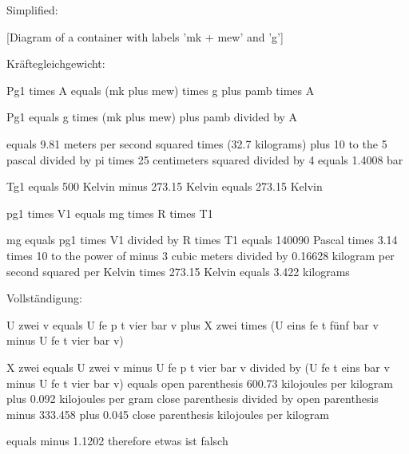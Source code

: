 Simplified:

[Diagram of a container with labels 'mk + mew' and 'g']

Kräftegleichgewicht:

Pg1 times A equals (mk plus mew) times g plus pamb times A

Pg1 equals g times (mk plus mew) plus pamb divided by A

equals 9.81 meters per second squared times (32.7 kilograms) plus 10 to the 5 pascal divided by pi times 25 centimeters squared divided by 4 equals 1.4008 bar

Tg1 equals 500 Kelvin minus 273.15 Kelvin equals 273.15 Kelvin

pg1 times V1 equals mg times R times T1

mg equals pg1 times V1 divided by R times T1 equals 140090 Pascal times 3.14 times 10 to the power of minus 3 cubic meters divided by 0.16628 kilogram per second squared per Kelvin times 273.15 Kelvin equals 3.422 kilograms

Vollständigung:

U zwei v equals U fe p t vier bar v plus X zwei times (U eins fe t fünf bar v minus U fe t vier bar v)

X zwei equals U zwei v minus U fe p t vier bar v divided by (U fe t eins bar v minus U fe t vier bar v) equals open parenthesis 600.73 kilojoules per kilogram plus 0.092 kilojoules per gram close parenthesis divided by open parenthesis minus 333.458 plus 0.045 close parenthesis kilojoules per kilogram

equals minus 1.1202 therefore etwas ist falsch